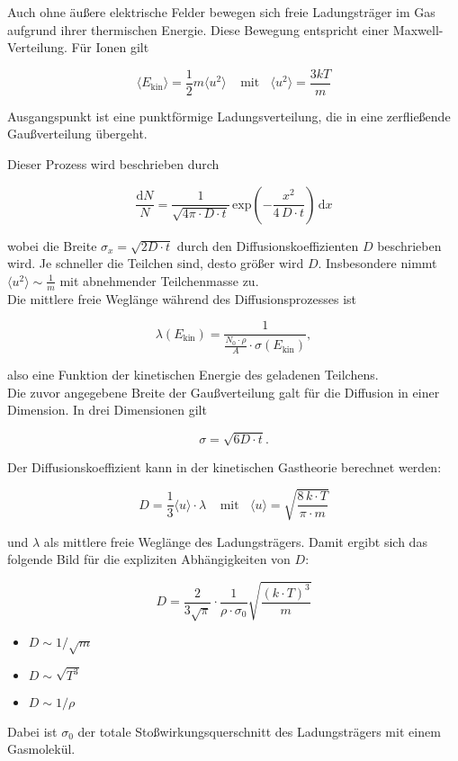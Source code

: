 Auch ohne äußere elektrische Felder bewegen sich freie Ladungsträger im Gas aufgrund ihrer
thermischen Energie. Diese Bewegung entspricht einer Maxwell-Verteilung. Für Ionen gilt

\[\langle E_{\text{kin}} \rangle = \frac{1}{2} m \langle u^2 \rangle ~~~~~\text{mit}~~~~ \langle u^2
\rangle = \frac{3kT}{m}
\]

Ausgangspunkt ist eine punktförmige Ladungsverteilung, die in eine zerfließende Gaußverteilung
übergeht.

\begin{figure}[H]
		\centering
		
\end{figure}

Dieser Prozess wird beschrieben durch

\[\frac{\mathrm{d}N}{N} = \frac{1}{\sqrt{4\pi\cdot D\cdot t}}\,
\text{exp}\left(-\frac{x^2}{4\,D\cdot t}\right)\,\mathrm{d}x
\]

wobei die Breite $\sigma_x=\sqrt{2D\cdot t}$ durch den Diffusionskoeffizienten $D$ beschrieben wird.
Je schneller die Teilchen sind, desto größer wird $D$. Insbesondere nimmt $\langle u^2 \rangle \sim
\frac{1}{m}$ mit abnehmender Teilchenmasse zu.
\\
Die mittlere freie Weglänge während des Diffusionsprozesses ist 

\[\lambda(E_{\text{kin}}) = \frac{1}{\frac{N_0\cdot\rho}{A}\cdot \sigma(E_{\text{kin}})} ,\]

also eine Funktion der kinetischen Energie des geladenen Teilchens.
\\
Die zuvor angegebene Breite der Gaußverteilung galt für die Diffusion in einer Dimension. In drei
Dimensionen gilt

\[\sigma = \sqrt{6D\cdot t} . \]

Der Diffusionskoeffizient kann in der kinetischen Gastheorie berechnet werden:

\[D=\frac{1}{3} \langle u \rangle \cdot \lambda~~~~~\text{mit}~~~~\langle u \rangle
=\sqrt{\frac{8\,k\cdot T}{\pi\cdot m}}\]

und $\lambda$ als mittlere freie Weglänge des Ladungsträgers. Damit ergibt sich das folgende Bild
für die expliziten Abhängigkeiten von $D$:

\[ D= \frac{2}{3\sqrt{\pi}}\cdot \frac{1}{\rho\cdot\sigma_0}\sqrt{\frac{(k\cdot T)^3}{m}} \]

\begin{itemize}
  \item $D\sim 1/\sqrt{m}$
  \item $D\sim \sqrt{T^3}$
  \item $D\sim 1/\rho$
\end{itemize}

Dabei ist $\sigma_0$ der totale Stoßwirkungsquerschnitt des Ladungsträgers mit einem Gasmolekül.
